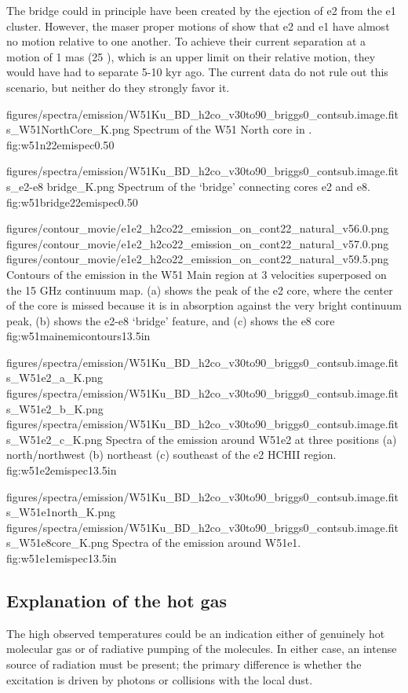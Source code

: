 The bridge could in principle have been created by the ejection of e2 from the
e1 cluster.  However, the maser proper motions of \citep{Sato2014a} show that
e2 and e1 have almost no motion relative to one another.  To achieve their
current separation at a motion of 1 mas \peryr (25 \kms), which is an upper
limit on their relative motion, they would have had to separate 5-10 kyr ago.
The current data do not rule out this scenario, but neither do they strongly
favor it.

\Figure
{{figures/spectra/emission/W51Ku_BD_h2co_v30to90_briggs0_contsub.image.fits_W51NorthCore_K}.png}
{Spectrum of the W51 North core in \ortho \twotwo.}
{fig:w51n22emispec}{0.5}{0}

\Figure
{{figures/spectra/emission/W51Ku_BD_h2co_v30to90_briggs0_contsub.image.fits_e2-e8 bridge_K}.png}
{Spectrum of the `bridge' connecting cores e2 and e8.}
{fig:w51bridge22emispec}{0.5}{0}

\FigureThreeAA
{figures/contour_movie/e1e2_h2co22_emission_on_cont22_natural_v56.0.png}
{figures/contour_movie/e1e2_h2co22_emission_on_cont22_natural_v57.0.png}
{figures/contour_movie/e1e2_h2co22_emission_on_cont22_natural_v59.5.png}
{Contours of the \formaldehyde \twotwo emission in the W51 Main region at 3
velocities superposed on the 15 GHz continuum map.  (a) shows the peak of the e2
core, where the center of the core is missed because it is in absorption
against the very bright continuum peak, (b) shows the e2-e8 `bridge' feature,
and (c) shows the e8 core}
{fig:w51mainemicontours}{1}{3.5in}

\FigureThreeAA
{figures/spectra/emission/W51Ku_BD_h2co_v30to90_briggs0_contsub.image.fits_W51e2_a_K.png}
{figures/spectra/emission/W51Ku_BD_h2co_v30to90_briggs0_contsub.image.fits_W51e2_b_K.png}
{figures/spectra/emission/W51Ku_BD_h2co_v30to90_briggs0_contsub.image.fits_W51e2_c_K.png}
{Spectra of the \twotwo emission around W51e2 at three positions (a)
north/northwest (b) northeast (c) southeast of the e2 HCHII region.
}
{fig:w51e2emispec}{1}{3.5in}

\FigureTwoAA
{figures/spectra/emission/W51Ku_BD_h2co_v30to90_briggs0_contsub.image.fits_W51e1north_K.png}
{figures/spectra/emission/W51Ku_BD_h2co_v30to90_briggs0_contsub.image.fits_W51e8core_K.png}
{Spectra of the \twotwo emission around W51e1.
}
{fig:w51e1emispec}{1}{3.5in}

\subsection{Explanation of the hot gas}
The high observed temperatures could be an indication either of genuinely hot
molecular gas or of radiative pumping of the \formaldehyde molecules.  In
either case, an intense source of radiation must be present; the primary
difference is whether the excitation is driven by photons or collisions with
the local dust.


